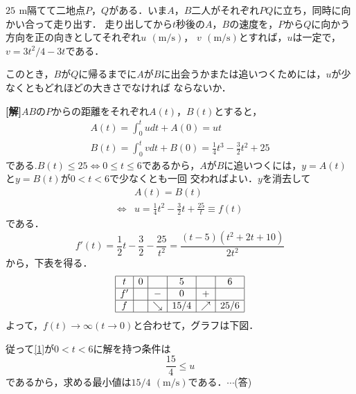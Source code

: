 \documentclass[a4j]{jarticle}
\begin{document}

     \begin{oframed}
     $25\,\ \mathrm{m}$隔てて二地点$P$，$Q$がある．いま$A$，$B$二人がそれぞれ$P$$Q$に立ち，同時に向かい合って走り出す．
     走り出してから$t$秒後の$A$，$B$の速度を，$P$から$Q$に向かう方向を正の向きとしてそれぞれ$u \,\ \mathrm{(m/s)}$，
     $v\,\ \mathrm{(m/s)}$とすれば，$u$は一定で，$v=3t^2/4-3t$である．
     
     このとき，$B$が$Q$に帰るまでに$A$が$B$に出会うかまたは追いつくためには，$u$が少なくともどれほどの大きさでなければ
     ならないか．
     \end{oframed}

\setlength{\columnseprule}{0.4pt}
\begin{multicols}{2}
{\bf[解]}$A$$B$の$P$からの距離をそれぞれ$A(t)$，$B(t)$とすると，
     \begin{align*}
     A(t)=\int_0^tudt+A(0)=ut \\
     B(t)=\int_0^tvdt+B(0)=\frac{1}{4}t^3-\frac{3}{2}t^2+25
     \end{align*}
である.$B(t)\le25\Longleftrightarrow0\le t\le6$であるから，$A$が$B$に追いつくには，$y=A(t)$と$y=B(t)$が$0<t<6$で少なくとも一回
交わればよい．$y$を消去して
     \begin{align}
     &A(t)=B(t) \nonumber \\
     \Longleftrightarrow &u=\frac{1}{4}t^2-\frac{3}{2}t+\frac{25}{t}\equiv f(t)\label{1}
     \end{align}
である．
      \[f'(t)=\frac{1}{2}t-\frac{3}{2}-\frac{25}{t^2}=\frac{(t-5)(t^2+2t+10)}{2t^2}\] 
から，下表を得る．
     \begin{align*}
          \begin{array}{|c|c|c|c|c|c|}\hline
          t  & 0 &     & 5     &     &6  \\ \hline
          f' &    & -   & 0     &+    &    \\  \hline
          f  &    &\searrow&15/4 &\nearrow &25/6  \\ \hline  
          \end{array}
     \end{align*}
よって，$f(t)\to\infty(t\to0)$と合わせて，グラフは下図．
     \begin{center}
     \scalebox{1}{a}
     \end{center}
従って\eqref{1}が$0<t<6$に解を持つ条件は
     \[\frac{15}{4}\le u\]     
であるから，求める最小値は$15/4 \,\ \mathrm{(m/s)}$である．$\cdots$(答)          
\newpage
\end{multicols}
\end{document}
